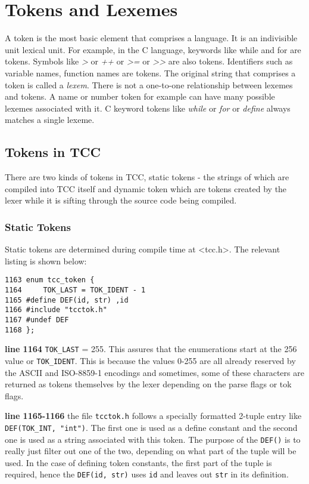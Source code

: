 
\chapter{Tokens and Lexemes}

A token is the most basic element that comprises a language. It is an indivisible unit lexical unit. For example, in the C language, keywords like while and for are tokens. Symbols like \emph{>} or \emph{++} or \emph{>=} or \emph{>>} are also tokens. Identifiers such as variable names, function names are tokens. The original string that comprises a token is called a \emph{lexem}. There is not a one-to-one relationship between lexemes and tokens. A name or number token for example can have many possible lexemes associated with it. C keyword tokens like \emph{while} or \emph{for} or \emph{define} always matches a single lexeme. 

\section{Tokens in TCC}

There are two kinds of tokens in TCC, static tokens - the strings of which are compiled into TCC itself and dynamic token which are tokens created by the lexer while it is sifting through the source code being compiled.

\subsection{Static Tokens}
Static tokens are determined during compile time at <tcc.h>. The relevant listing is shown below:
\begin{verbatim}
1163 enum tcc_token {
1164     TOK_LAST = TOK_IDENT - 1
1165 #define DEF(id, str) ,id
1166 #include "tcctok.h"
1167 #undef DEF
1168 };
\end{verbatim}

\begin{tcc_desc}
\textbf{line 1164} \verb|TOK_LAST| = 255. This assures that the enumerations start at the 256 value or \verb|TOK_IDENT|. This is because the values 0-255 are all already reserved by the ASCII and ISO-8859-1 encodings and sometimes, some of these characters are returned as tokens themselves by the lexer depending on the parse flags or tok flags.

\textbf{line 1165-1166} the file \verb|tcctok.h| follows a specially formatted 2-tuple entry like \verb|DEF(TOK_INT, "int")|. The first one is used as a define constant and the second one is used as a string associated with this token. The purpose of the \verb|DEF()| is to really just filter out one of the two, depending on what part of the tuple will be used. In the case of defining token constants, the first part of the tuple is required, hence the \verb|DEF(id, str)| uses \verb|id| and leaves out \verb|str| in its definition.
\end{tcc_desc}

